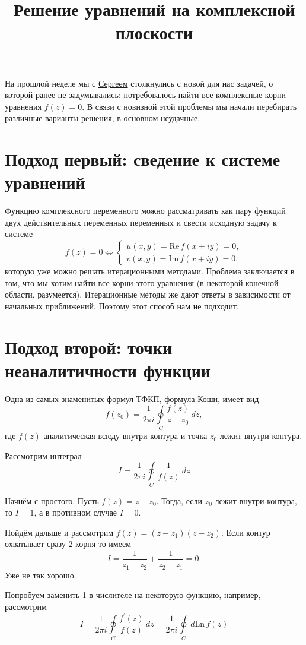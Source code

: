 \documentclass{ncc}
\title{Решение уравнений на комплексной плоскости}
\begin{document}
\maketitle
\tableofcontents
На прошлой неделе мы с \href{https://github.com/sputnikas}{Сергеем} столкнулись с новой для нас задачей, о которой ранее
не задумывались: потребовалось найти все комплексные корни уравнения \( f(z) =
0 \). В связи с новизной этой проблемы мы начали перебирать различные варианты
решения, в основном неудачные.


\section{Подход первый: сведение к системе уравнений}

Функцию комплексного переменного можно рассматривать как пару функций двух
действительных переменных переменных и свести исходную задачу к системе
\[
    f(z) = 0 \Leftrightarrow
    \begin{cases}
    u(x,y) = \mathrm{Re\,} f(x+iy) = 0,\\
    v(x,y) = \mathrm{Im\,} f(x+iy) = 0,
    \end{cases}
\]
которую уже можно решать итерационными методами. Проблема заключается в том, что
мы хотим найти все корни этого уравнения (в некоторой конечной области,
разумеется). Итерационные методы же дают ответы в зависимости от начальных
приближений. Поэтому этот способ нам не подходит.

\section{Подход второй: точки неаналитичности функции}

Одна из самых знаменитых формул ТФКП, формула Коши, имеет вид
\[
    f(z_0) = \frac{1}{2\pi i}\oint\limits_{C} \frac{f(z)}{z-z_0}\,dz,
\]
где \(f(z)\) аналитическая всюду внутри контура и точка \(z_0\) лежит внутри
контура.

Рассмотрим интеграл
\[
    I = \frac{1}{2\pi i}\oint\limits_{C} \frac{1}{f(z)}\,dz
\]

Начнём с простого. Пусть \( f(z) = z - z_0 \). Тогда, если  \( z_0 \) лежит внутри контура, то \(I = 1\), а в противном случае \(I=0\).

Пойдём дальше и рассмотрим \(f(z) = (z-z_1)(z-z_2)\). Если контур охватывает сразу 2 корня то имеем
\[
I = \frac{1}{z_1 - z_2} + \frac{1}{z_2 - z_1} = 0.
\]
Уже не так хорошо.

Попробуем заменить 1  в числителе на некоторую функцию, например, рассмотрим
\[
    I = \frac{1}{2\pi i}\oint\limits_{C} \frac{f^\prime(z)}{f(z)}\,dz =
    \frac{1}{2\pi i}\oint\limits_{C}\, d \mathrm{Ln\,} f(z)
\]
\end{document}
